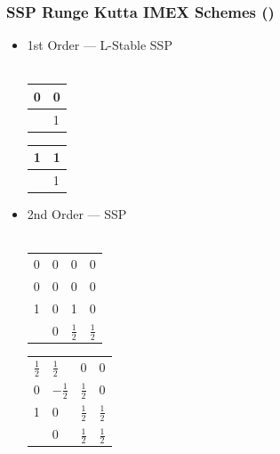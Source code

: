 \documentclass[10pt]{beamer}
\begin{document}
\begin{frame}
  \frametitle{SSP Runge Kutta IMEX Schemes (\textcite{pareschi2000implicit})}
  \begin{itemize}
    \item 1st Order --- L-Stable SSP \hfill \\ \hfill \\
      \begin{tabular}{r|l}
        0 & 0 \\
        \midrule
          & 1
      \end{tabular}\hspace{0.5cm}
      \begin{tabular}{r|l}
        1 & 1 \\
        \midrule
          & 1
      \end{tabular}

    \vspace{0.5cm}

    \item 2nd Order --- SSP \hfill \\ \hfill \\
      \begin{tabular}{r|lll}
        0 & 0 & 0 & 0 \\
        0 & 0 & 0 & 0 \\
        1 & 0 & 1 & 0 \\
        \midrule
          & 0 & \(\frac{1}{2}\) & \(\frac{1}{2}\) \\
      \end{tabular}\hspace{0.5cm}
      \begin{tabular}{r|lll}
        \(\frac{1}{2}\) & \(\frac{1}{2}\) & 0 & 0 \\
        0 & \(-\frac{1}{2}\) & \(\frac{1}{2}\) & 0 \\
        1 & 0 & \(\frac{1}{2}\) & \(\frac{1}{2}\) \\
        \midrule
          & 0 & \(\frac{1}{2}\) & \(\frac{1}{2}\) \\
      \end{tabular}
  \end{itemize}
\end{frame}
\end{document}
